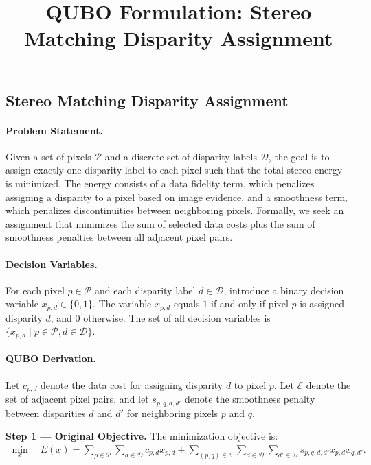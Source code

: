 \documentclass[12pt]{article}
\title{QUBO Formulation: Stereo Matching Disparity Assignment}
\date{}
\begin{document}
\maketitle

\subsection*{Stereo Matching Disparity Assignment}

\paragraph{Problem Statement.}
Given a set of pixels $\mathcal{P}$ and a discrete set of disparity labels $\mathcal{D}$, the goal is to assign exactly one disparity label to each pixel such that the total stereo energy is minimized. The energy consists of a data fidelity term, which penalizes assigning a disparity to a pixel based on image evidence, and a smoothness term, which penalizes discontinuities between neighboring pixels. Formally, we seek an assignment that minimizes the sum of selected data costs plus the sum of smoothness penalties between all adjacent pixel pairs.

\paragraph{Decision Variables.}
For each pixel $p \in \mathcal{P}$ and each disparity label $d \in \mathcal{D}$, introduce a binary decision variable $x_{p,d} \in \{0,1\}$. The variable $x_{p,d}$ equals $1$ if and only if pixel $p$ is assigned disparity $d$, and $0$ otherwise. The set of all decision variables is $\{x_{p,d} \mid p \in \mathcal{P}, d \in \mathcal{D}\}$.

\paragraph{QUBO Derivation.}
Let $c_{p,d}$ denote the data cost for assigning disparity $d$ to pixel $p$. Let $\mathcal{E}$ denote the set of adjacent pixel pairs, and let $s_{p,q,d,d'}$ denote the smoothness penalty between disparities $d$ and $d'$ for neighboring pixels $p$ and $q$.

\textbf{Step 1 --- Original Objective.}
The minimization objective is:
\begin{align}
    \min_{x} \quad E(x) = \sum_{p \in \mathcal{P}} \sum_{d \in \mathcal{D}} c_{p,d} x_{p,d} + \sum_{(p,q) \in \mathcal{E}} \sum_{d \in \mathcal{D}} \sum_{d' \in \mathcal{D}} s_{p,q,d,d'} x_{p,d} x_{q,d'}.
\end{align}
\end{document}

